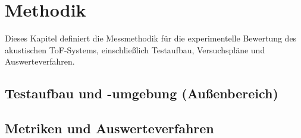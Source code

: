 \section{Methodik}

Dieses Kapitel definiert die Messmethodik für die experimentelle Bewertung des akustischen ToF-Systems, einschließlich Testaufbau, Versuchspläne und Auswerteverfahren.

\subsection{Testaufbau und -umgebung (Außenbereich)}

\subsection{Metriken und Auswerteverfahren}

